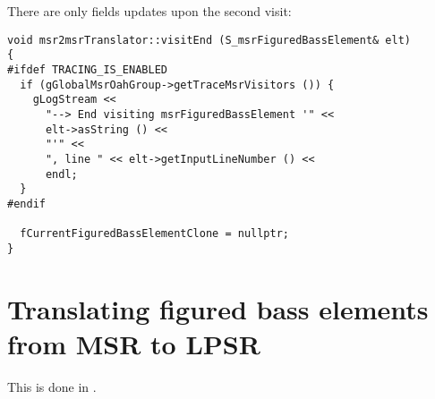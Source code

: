 There are only fields updates upon the second visit:
\begin{lstlisting}[language=CPlusPlus]
void msr2msrTranslator::visitEnd (S_msrFiguredBassElement& elt)
{
#ifdef TRACING_IS_ENABLED
  if (gGlobalMsrOahGroup->getTraceMsrVisitors ()) {
    gLogStream <<
      "--> End visiting msrFiguredBassElement '" <<
      elt->asString () <<
      "'" <<
      ", line " << elt->getInputLineNumber () <<
      endl;
  }
#endif

  fCurrentFiguredBassElementClone = nullptr;
}
\end{lstlisting}


\section{Translating figured bass elements from MSR to LPSR}

This is done in \msrToLpsr{}.

